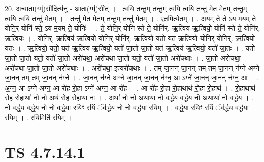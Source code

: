 \documentclass[17pt]{extarticle}
\begin{document}
20. अ॒न्वाता(ग्म्॑)सी॒दित्य॑नु - आता(ग्म्॑)सीत् । . त्वयि॒ तन्तु॒म् तन्तु॒म् त्वयि॒ त्वयि॒ तन्तु॑ मे॒त मे॒तम् तन्तु॒म् त्वयि॒ त्वयि॒ तन्तु॑ मे॒तम् । . तन्तु॑ मे॒त मे॒तम् तन्तु॒म् तन्तु॑ मे॒तम् । . ए॒तमित्ये॒तम् । . अ॒यम् ते॑ ते॒ ऽय म॒यम् ते॒ योनि॒र् योनि॑ स्ते॒ ऽय म॒यम् ते॒ योनिः॑ । . ते॒ योनि॒र् योनि॑ स्ते ते॒ योनि॑र्. ऋ॒त्विय॑ ऋ॒त्वियो॒ योनि॑ स्ते ते॒ योनि॑र्. ऋ॒त्वियः॑ । . योनि॑र्. ऋ॒त्विय॑ ऋ॒त्वियो॒ योनि॒र् योनि॑र्. ऋ॒त्वियो॒ यतो॒ यत॑ ऋ॒त्वियो॒ योनि॒र् योनि॑र्. ऋ॒त्वियो॒ यतः॑ । . ऋ॒त्वियो॒ यतो॒ यत॑ ऋ॒त्विय॑ ऋ॒त्वियो॒ यतो॑ जा॒तो जा॒तो यत॑ ऋ॒त्विय॑ ऋ॒त्वियो॒ यतो॑ जा॒तः । . यतो॑ जा॒तो जा॒तो यतो॒ यतो॑ जा॒तो अरो॑चथा॒ अरो॑चथा जा॒तो यतो॒ यतो॑ जा॒तो अरो॑चथाः । . जा॒तो अरो॑चथा॒ अरो॑चथा जा॒तो जा॒तो अरो॑चथाः । . अरो॑चथा॒ इत्यरो॑चथाः । . तम् जा॒नन् जा॒नन् तम् तम् जा॒नन् न॑ग्ने अग्ने जा॒नन् तम् तम् जा॒नन् न॑ग्ने । . जा॒नन् न॑ग्ने अग्ने जा॒नन् जा॒नन् न॑ग्न॒ आ ऽग्ने॑ जा॒नन् जा॒नन् न॑ग्न॒ आ । . अ॒ग्न॒ आ ऽग्ने॑ अग्न॒ आ रो॑ह रो॒हा ऽग्ने॑ अग्न॒ आ रो॑ह । . आ रो॑ह रो॒हा रो॒हाथाथ॑ रो॒हा रो॒हाथ॑ । . रो॒हाथाथ॑ रोह रो॒हाथा॑ नो नो॒ अथ॑ रोह रो॒हाथा॑ नः । . अथा॑ नो नो॒ अथाथा॑ नो वर्द्धय वर्द्धय नो॒ अथाथा॑ नो वर्द्धय । . नो॒ व॒र्द्ध॒य॒ व॒र्द्ध॒य॒ नो॒ नो॒ व॒र्द्ध॒या॒ र॒यिꣳ र॒यिं ॅव॑र्द्धय नो नो वर्द्धया र॒यिम् । . व॒र्द्ध॒या॒ र॒यिꣳ र॒यिं ॅव॑र्द्धय वर्द्धया र॒यिम् । . र॒यिमिति॑ र॒यिम् । \newline
\pagebreak
{}

\section{ TS 4.7.14.1 }
\end{document}
